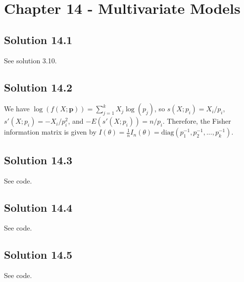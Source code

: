 \section*{Chapter 14 - Multivariate Models}

\subsection*{Solution 14.1}

See solution 3.10.


\subsection*{Solution 14.2}

We have $\log(f(X;\bm{p})) = \sum_{j = 1}^k X_j \log(p_j)$, so $s(X;p_i) = X_i/p_i$, $s'(X;p_i) = -X_i/p_i^2$, and $-E(s'(X;p_i)) = n/p_i$.
Therefore, the Fisher information matrix is given by $I(\theta) = \frac{1}{n} I_n(\theta) = \mathrm{diag}(p_1^{-1}, p_2^{-1}, ..., p_k^{-1})$.


\subsection*{Solution 14.3}

See code.


\subsection*{Solution 14.4}

See code.


\subsection*{Solution 14.5}

See code.
